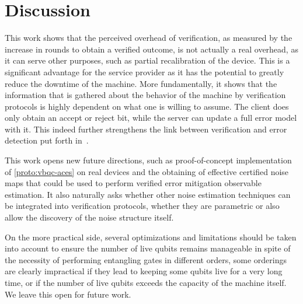\section{Discussion}
This work shows that the perceived overhead of verification, as measured by the increase in rounds to obtain a verified outcome, is not actually a real overhead, as it can serve other purposes, such as partial recalibration of the device. This is a significant advantage for the service provider as it has the potential to greatly reduce the downtime of the machine. More fundamentally, it shows that the information that is gathered about the behavior of the machine by verification protocols is highly dependent on what one is willing to assume. The client does only obtain an accept or reject bit, while the server can update a full error model with it. This indeed further strengthens the link between verification and error detection put forth in~\cite{KKLM22unifying}.

This work opens new future directions, such as proof-of-concept implementation of \cref{proto:vbqc-aces} on real devices and the obtaining of effective certified noise maps that could be used to perform verified error mitigation observable estimation. It also naturally asks whether other noise estimation techniques can be integrated into verification protocols, whether they are parametric or also allow the discovery of the noise structure itself.

On the more practical side, several optimizations and limitations should be taken into account to ensure the number of live qubits remains manageable in spite of the necessity of performing entangling gates in different orders, some orderings are clearly impractical if they lead to keeping some qubits live for a very long time, or if the number of live qubits exceeds the capacity of the machine itself.  We leave this open for future work.


